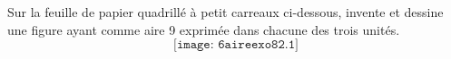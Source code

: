 Sur la feuille de papier quadrillé à petit carreaux ci-dessous,
invente et dessine une figure ayant comme aire 9 exprimée dans chacune des trois unités.
\[\texttt{[image: 6aireexo82.1]}\] 
